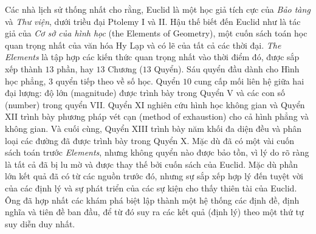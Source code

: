 \begin{multicols}{2}
	\vskip 0.1cm
	Các nhà lịch sử thống nhất cho rằng, Euclid là một học giả tích cực của \textit{Bảo tàng} và \textit{Thư viện}, dưới triều đại Ptolemy I và II. 
	\vskip 0.1cm
	Hậu thế biết đến Euclid như là tác giả của \textit{Cơ sở của hình học} (the Elements of Geometry), một cuốn sách toán học quan trọng nhất của văn hóa Hy Lạp và có lẽ của tất cả các thời đại. \textit{The Elements} là tập hợp các kiến thức quan trọng nhất vào thời điểm đó, được sắp xếp thành $13$ phần, hay $13$ Chương ($13$ Quyển). Sáu quyển đầu dành cho Hình học phẳng, $3$ quyển tiếp theo về số học. Quyển $10$ cung cấp mối liên hệ giữa hai đại lượng: độ lớn (magnitude) được trình bày trong Quyển V và các con số (number) trong quyển VII. Quyển XI nghiên cứu hình học không gian và Quyển XII trình bày phương pháp vét cạn (method of exhaustion) cho cả hình phẳng và không gian. Và cuối cùng, Quyển XIII trình bày năm khối đa diện đều và phân loại các đường đã được trình bày trong Quyển X.   
	\vskip 0.1cm
	Mặc dù đã có một vài cuốn sách toán trước \textit{Elements}, nhưng không quyển nào được bảo  tồn, vì lý do rõ ràng là tất cả đã bị lu mờ và được thay thế bởi cuốn sách của Euclid.
	\vskip 0.1cm
	Mặc dù phần lớn kết quả đã có từ các nguồn trước đó, nhưng sự sắp xếp hợp lý đến tuyệt vời của các định lý và sự phát triển của các sự kiện cho thấy thiên tài của Euclid. Ông đã hợp nhất các khám phá biệt lập thành một hệ thống các định đề, định nghĩa và tiên đề ban đầu, để từ đó suy ra các kết quả (định lý) theo một thứ tự suy diễn duy nhất.
	\begin{figure}[H]
		\vspace*{5pt}
		\centering
		\captionsetup{labelformat= empty, justification=centering}

\end{figure}
\end{multicols}
